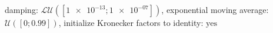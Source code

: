 damping: $\mathcal{LU}([\num[scientific-notation=true]{1e-13}; \num[scientific-notation=true]{1e-07}])$, exponential moving average: $\mathcal{U}([0; \num[scientific-notation=true]{0.99}])$, initialize Kronecker factors to identity: $\text{yes}$
